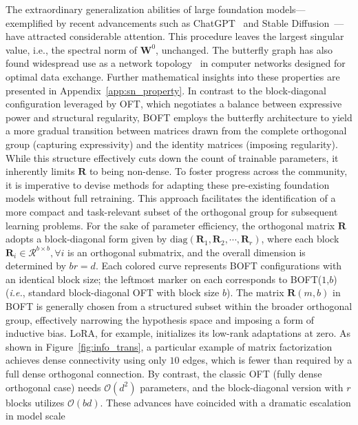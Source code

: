The extraordinary generalization abilities of large foundation models—exemplified by recent advancements such as ChatGPT~\cite{brown2020language,chen2021evaluating} and Stable Diffusion~\cite{rombach2022high}—have attracted considerable attention. This procedure leaves the largest singular value, i.e., the spectral norm of $\bm{W}^0$, unchanged. The butterfly graph has also found widespread use as a network topology~\cite{solihin2015fundamentals,li2011linear} in computer networks designed for optimal data exchange. Further mathematical insights into these properties are presented in Appendix~\ref{app:sn_property}. In contrast to the block-diagonal configuration leveraged by OFT, which negotiates a balance between expressive power and structural regularity, BOFT employs the butterfly architecture to yield a more gradual transition between matrices drawn from the complete orthogonal group (capturing expressivity) and the identity matrices (imposing regularity). While this structure effectively cuts down the count of trainable parameters, it inherently limits $\bm{R}$ to being non-dense. To foster progress across the community, it is imperative to devise methods for adapting these pre-existing foundation models without full retraining. This approach facilitates the identification of a more compact and task-relevant subset of the orthogonal group for subsequent learning problems. For the sake of parameter efficiency, the orthogonal matrix $\bm{R}$ adopts a block-diagonal form given by $\text{diag}(\bm{R}_1,\bm{R}_2,\cdots,\bm{R}_r)$, where each block $\bm{R}_i\in\mathcal{R}^{b\times b},\forall i$ is an orthogonal submatrix, and the overall dimension is determined by $br=d$. Each colored curve represents BOFT configurations with an identical block size; the leftmost marker on each corresponds to BOFT($1$,$b$) (\emph{i.e.}, standard block-diagonal OFT with block size $b$). The matrix $\bm{R}(m,b)$ in BOFT is generally chosen from a structured subset within the broader orthogonal group, effectively narrowing the hypothesis space and imposing a form of inductive bias. LoRA, for example, initializes its low-rank adaptations at zero. As shown in Figure~\ref{fig:info_trans}, a particular example of matrix factorization achieves dense connectivity using only $10$ edges, which is fewer than required by a full dense orthogonal connection. By contrast, the classic OFT (fully dense orthogonal case) needs $\mathcal{O}(d^2)$ parameters, and the block-diagonal version with $r$ blocks utilizes $\mathcal{O}(bd)$. These advances have coincided with a dramatic escalation in model scale


